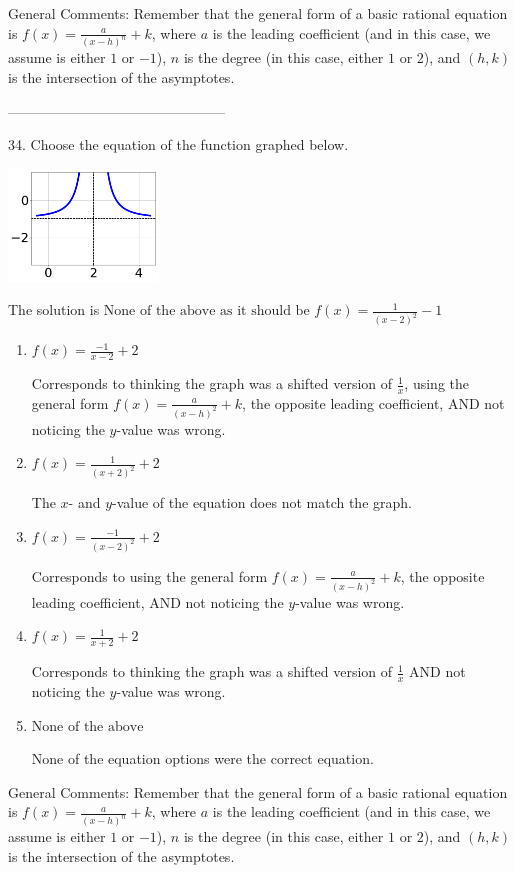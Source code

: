 \documentclass{extbook}[14pt]
\begin{document}
General Comments: Remember that the general form of a basic rational equation is $ f(x) = \frac{a}{(x-h)^n} + k$, where $a$ is the leading coefficient (and in this case, we assume is either $1$ or $-1$), $n$ is the degree (in this case, either $1$ or $2$), and $(h, k)$ is the intersection of the asymptotes.

-----------------------------------------------

34. Choose the equation of the function graphed below.
\begin{center} \includegraphics[width=0.3\textwidth]{../Figures/rationalGraphToEquationC.png} \end{center} 

The solution is $ \text{None of the above as it should be } f(x) = \frac{1}{(x - 2)^2} - 1 $ 

\begin{enumerate}[label=\Alph*.] 
\item $ f(x) = \frac{-1}{x - 2} + 2 $ 

 Corresponds to thinking the graph was a shifted version of $\frac{1}{x}$, using the general form $f(x) = \frac{a}{(x-h)^2}+k$, the opposite leading coefficient, AND not noticing the $y$-value was wrong. 
\item $ f(x) = \frac{1}{(x + 2)^2} + 2 $ 

 The $x$- and $y$-value of the equation does not match the graph. 
\item $ f(x) = \frac{-1}{(x - 2)^2} + 2 $ 

 Corresponds to using the general form $f(x) = \frac{a}{(x-h)^2}+k$, the opposite leading coefficient, AND not noticing the $y$-value was wrong. 
\item $ f(x) = \frac{1}{x + 2} + 2 $ 

 Corresponds to thinking the graph was a shifted version of $\frac{1}{x}$ AND not noticing the $y$-value was wrong. 
\item $ \text{None of the above} $ 

 None of the equation options were the correct equation. 
\end{enumerate} 
 
General Comments: Remember that the general form of a basic rational equation is $ f(x) = \frac{a}{(x-h)^n} + k$, where $a$ is the leading coefficient (and in this case, we assume is either $1$ or $-1$), $n$ is the degree (in this case, either $1$ or $2$), and $(h, k)$ is the intersection of the asymptotes.
\end{document}

